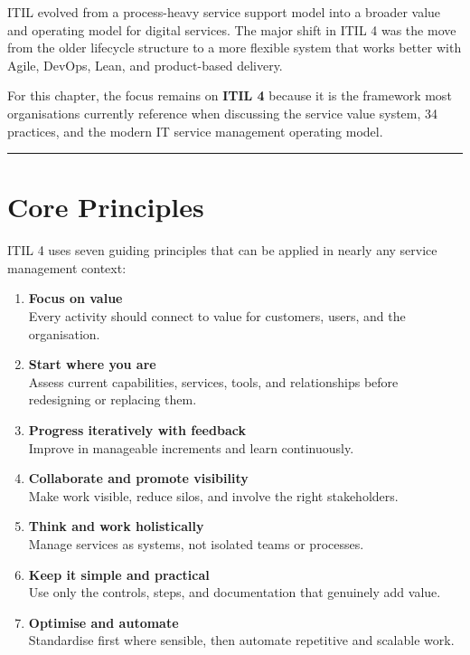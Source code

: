 \documentclass[
  letterpaper,
  DIV=11,
  numbers=noendperiod]{scrartcl}
\begin{document}
ITIL evolved from a process-heavy service support model into a broader
value and operating model for digital services. The major shift in ITIL
4 was the move from the older lifecycle structure to a more flexible
system that works better with Agile, DevOps, Lean, and product-based
delivery.

For this chapter, the focus remains on \textbf{ITIL 4} because it is the
framework most organisations currently reference when discussing the
service value system, 34 practices, and the modern IT service management
operating model.

\begin{center}\rule{0.5\linewidth}{0.5pt}\end{center}

\section{Core Principles}\label{core-principles}

ITIL 4 uses seven guiding principles that can be applied in nearly any
service management context:

\begin{enumerate}
\def\labelenumi{\arabic{enumi}.}
\item
  \textbf{Focus on value}\\
  Every activity should connect to value for customers, users, and the
  organisation.
\item
  \textbf{Start where you are}\\
  Assess current capabilities, services, tools, and relationships before
  redesigning or replacing them.
\item
  \textbf{Progress iteratively with feedback}\\
  Improve in manageable increments and learn continuously.
\item
  \textbf{Collaborate and promote visibility}\\
  Make work visible, reduce silos, and involve the right stakeholders.
\item
  \textbf{Think and work holistically}\\
  Manage services as systems, not isolated teams or processes.
\item
  \textbf{Keep it simple and practical}\\
  Use only the controls, steps, and documentation that genuinely add
  value.
\item
  \textbf{Optimise and automate}\\
  Standardise first where sensible, then automate repetitive and
  scalable work.
\end{enumerate}
\end{document}
